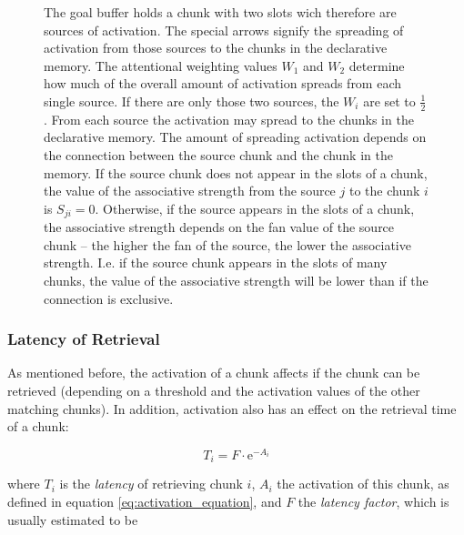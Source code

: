 \begin{figure}[htb]
\caption{The goal buffer holds a chunk with two slots wich therefore are sources of activation. The special arrows signify the spreading of activation from those sources to the chunks in the declarative memory. The attentional weighting values $W_1$ and $W_2$ determine how much of the overall amount of activation spreads from each single source. If there are only those two sources, the $W_i$ are set to $\frac{1}{2}$. From each source the activation may spread to the chunks in the declarative memory. The amount of spreading activation depends on the connection between the source chunk and the chunk in the memory. If the source chunk does not appear in the slots of a chunk, the value of the associative strength from the source $j$ to the chunk $i$ is $S_{ji} = 0$. Otherwise, if the source appears in the slots of a chunk, the associative strength depends on the fan value of the source chunk -- the higher the fan of the source, the lower the associative strength. I.e. if the source chunk appears in the slots of many chunks, the value of the associative strength will be lower than if the connection is exclusive. \cite[unit 5]{actr_tutorial}}
\label{fig:activation_spreading}
\end{figure}

\subsubsection{Latency of Retrieval}

As mentioned before, the activation of a chunk affects if the chunk can be retrieved (depending on a threshold and the activation values of the other matching chunks). In addition, activation also has an effect on the retrieval time of a chunk:

\begin{equation}
\label{eq:retrieval_latency}
T_i = F \cdot \mathrm{e}^{-A_i}
\end{equation}

where $T_i$ is the \emph{latency} of retrieving chunk $i$, $A_i$ the activation of this chunk, as defined in equation \eqref{eq:activation_equation}, and $F$ the \emph{latency factor}, which is usually estimated to be

